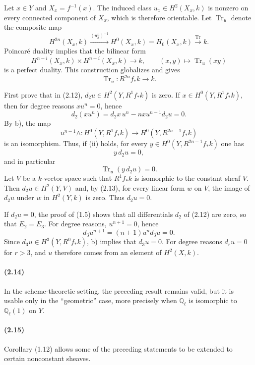 \documentclass[10pt]{article}
\providecommand{\Ql}{\mathbb Q_\ell}
\providecommand{\Tr}{\operatorname{Tr}}
\begin{document}
Let $x\in Y$ and $X_x=f^{-1}(x)$. The induced class $u_x\in H^2(X_x,k)$ is nonzero on every connected component of $X_x$, which is therefore orientable. Let $\Tr_u$ denote the composite map
\[
H^{2n}(X_x,k)\xrightarrow{(u_x^n)^{-1}}H^0(X_x,k)=H_0(X_x,k)\xrightarrow{\Tr}k.
\]
Poincaré duality implies that the bilinear form
\[
H^{n-i}(X_x,k)\times H^{n+i}(X_x,k)\longrightarrow k,
\qquad (x,y)\longmapsto \Tr_u(xy)
\]
is a perfect duality. This construction globalizes and gives
\[
\Tr_u:R^{2n}f_*k\longrightarrow k.
\]

First prove that in (2.12), $d_2u\in H^2(Y,R^1f_*k)$ is zero. If $x\in H^0(Y,R^1f_*k)$, then for degree reasons $xu^n=0$, hence
\[
d_2(xu^n)=d_2x\,u^n-nxu^{n-1}d_2u=0.
\]
By b), the map
\[
 u^{n-1}\wedge:H^0(Y,R^1f_*k)\longrightarrow H^0(Y,R^{2n-1}f_*k)
\]
is an isomorphism. Thus, if (ii) holds, for every $y\in H^0(Y,R^{2n-1}f_*k)$ one has
\[
y\,d_2u=0,
\]
and in particular
\[
\tag{2.13}
\Tr_u(y\,d_2u)=0.
\]
Let $V$ be a $k$-vector space such that $R^1f_*k$ is isomorphic to the constant sheaf $V$. Then $d_2u\in H^2(Y,V)$ and, by (2.13), for every linear form $w$ on $V$, the image of $d_2u$ under $w$ in $H^2(Y,k)$ is zero. Thus $d_2u=0$.

If $d_2u=0$, the proof of (1.5) shows that all differentials $d_2$ of (2.12) are zero, so that $E_2=E_3$. For degree reasons, $u^{n+1}=0$, hence
\[
d_3u^{n+1}=(n+1)u^n d_3u=0.
\]
Since $d_3u\in H^3(Y,R^0f_*k)$, b) implies that $d_3u=0$. For degree reasons $d_ru=0$ for $r>3$, and $u$ therefore comes from an element of $H^2(X,k)$.

\paragraph{(2.14)} In the scheme-theoretic setting, the preceding result remains valid, but it is usable only in the ``geometric'' case, more precisely when $\Ql$ is isomorphic to $\Ql(1)$ on $Y$.

\paragraph{(2.15)} Corollary (1.12) allows some of the preceding statements to be extended to certain nonconstant sheaves.
\end{document}
